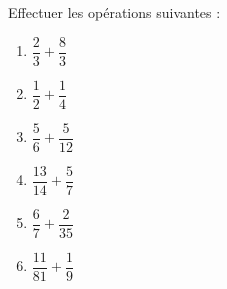 
\begin{exercice}\label{exo2smath-0038}

Effectuer les opérations suivantes :
\begin{multicols}{3}
    \begin{enumerate}
        \item
            \( \dfrac{ 2 }{ 3 }+\dfrac{ 8 }{ 3 }\)
        \item
            \( \dfrac{  1  }{ 2 }+\dfrac{  1  }{ 4 }\) 
        \item
            \( \dfrac{  5  }{ 6 }+\dfrac{  5  }{ 12 }\) 
        \item
            \( \dfrac{  13  }{ 14 }+\dfrac{  5  }{ 7 }\) 
        \item
            \( \dfrac{  6  }{ 7 }+\dfrac{  2  }{ 35 }\) 
        \item
            \( \dfrac{  11  }{ 81 }+\dfrac{  1  }{ 9 }\) 
    \end{enumerate}
\end{multicols}


\end{exercice}
